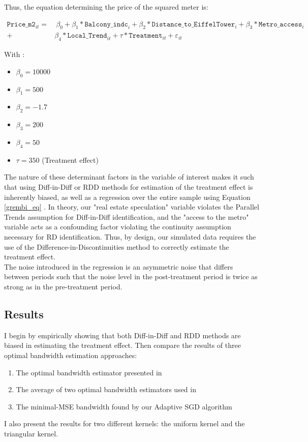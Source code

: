 \documentclass[12pt]{article}
\theoremstyle{plain}
\theoremstyle{remark}
\def\code#1{\texttt{#1}}
\begin{document}
Thus, the equation determining the price of the squared meter is:

\begin{align*}
    \code{Price\_m2}_{it} = &\ \beta_0 + \beta_1* \code{Balcony\_indc}_i + \beta_2 * \code{Distance\_to\_EiffelTower}_i + \beta_3 * \code{Metro\_access}_i \\ 
    + \  &\beta_4 * \code{Local\_Trend}_{it} + \tau * \code{Treatment}_{it} + \varepsilon_{it}
\end{align*}

With :
\begin{itemize}
    \item $\beta_0 = 10000$
    \item $\beta_1 = 500$
    \item $\beta_2 = -1.7$ 
    \item $\beta_3 = 200$
    \item $\beta_4 =50$
    \item $\tau = 350$ (Treatment effect)
 \end{itemize}

The nature of these determinant factors in the variable of interest makes it such that using Diff-in-Diff or RDD methods for estimation of the treatment effect is inherently biased, as well as a regression over the entire sample using Equation \ref{grembi_eq} \parencite{grembi2016do}. In theory, our "real estate speculation" variable violates the Parallel Trends assumption for Diff-in-Diff identification, and the "access to the metro" variable acts as a confounding factor violating the continuity assumption necessary for RD identification. Thus, by design, our simulated data requires the use of the Difference-in-Discontinuities method to correctly estimate the treatment effect. 
\\ The noise introduced in the regression is an asymmetric noise that differs between periods such that the noise level in the post-treatment period is twice as strong as in the pre-treatment period.


\subsection{Results}
I begin by empirically showing that both Diff-in-Diff and RDD methods are biased in estimating the treatment effect. Then compare the results of three optimal bandwidth estimation approaches:

\begin{enumerate}
    \item The optimal bandwidth estimator presented in \textcite{Imbens2012}
    \item The average of two optimal bandwidth estimators used in \textcite{grembi2016do}
    \item The minimal-MSE bandwidth found by our Adaptive SGD algorithm
\end{enumerate}
I also present the results for two different kernels: the uniform kernel and the triangular kernel.
\end{document}
